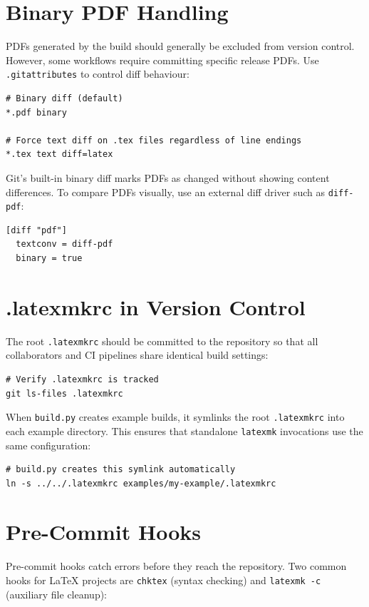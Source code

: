 \section{Binary PDF Handling}

PDFs generated by the build should generally be excluded from version
control.  However, some workflows require committing specific release
PDFs.  Use \texttt{.gitattributes} to control diff behaviour:

\begin{verbatim}
# Binary diff (default)
*.pdf binary

# Force text diff on .tex files regardless of line endings
*.tex text diff=latex
\end{verbatim}

Git's built-in binary diff marks PDFs as changed without showing content
differences.  To compare PDFs visually, use an external diff driver such
as \texttt{diff-pdf}:

\begin{verbatim}
[diff "pdf"]
  textconv = diff-pdf
  binary = true
\end{verbatim}

\section{.latexmkrc in Version Control}

The root \texttt{.latexmkrc} should be committed to the repository so
that all collaborators and CI pipelines share identical build settings:

\begin{verbatim}
# Verify .latexmkrc is tracked
git ls-files .latexmkrc
\end{verbatim}

When \texttt{build.py} creates example builds, it symlinks the root
\texttt{.latexmkrc} into each example directory.  This ensures that
standalone \texttt{latexmk} invocations use the same configuration:

\begin{verbatim}
# build.py creates this symlink automatically
ln -s ../../.latexmkrc examples/my-example/.latexmkrc
\end{verbatim}

\section{Pre-Commit Hooks}

Pre-commit hooks catch errors before they reach the repository.  Two
common hooks for LaTeX projects are \texttt{chktex} (syntax checking)
and \texttt{latexmk -c} (auxiliary file cleanup):

